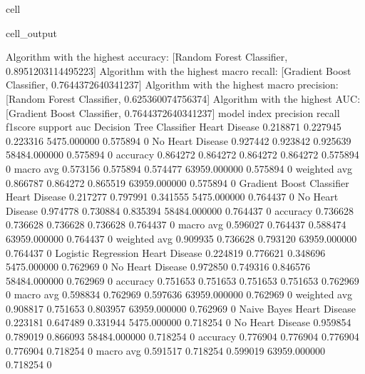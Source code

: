 \documentclass[letterpaper,10pt,english]{jupyterBook}
\begin{document}
\begin{sphinxuseclass}{cell}
\begin{sphinxVerbatimOutput}
\begin{sphinxuseclass}{cell_output}
\begin{sphinxVerbatim}[commandchars=\\\{\}]
Algorithm with the highest accuracy: [\PYGZsq{}Random Forest Classifier\PYGZsq{}, 0.8951203114495223]
Algorithm with the highest macro recall:
        [\PYGZsq{}Gradient Boost Classifier\PYGZsq{}, 0.7644372640341237]
Algorithm with the highest macro precision:
        [\PYGZsq{}Random Forest Classifier\PYGZsq{}, 0.625360074756374]
Algorithm with the highest AUC:
        [\PYGZsq{}Gradient Boost Classifier\PYGZsq{}, 0.7644372640341237]
model                      index             precision  recall    f1\PYGZhy{}score  support       auc     
Decision Tree Classifier   Heart Disease     0.218871   0.227945  0.223316  5475.000000   0.575894    0
                           No Heart Disease  0.927442   0.923842  0.925639  58484.000000  0.575894    0
                           accuracy          0.864272   0.864272  0.864272  0.864272      0.575894    0
                           macro avg         0.573156   0.575894  0.574477  63959.000000  0.575894    0
                           weighted avg      0.866787   0.864272  0.865519  63959.000000  0.575894    0
Gradient Boost Classifier  Heart Disease     0.217277   0.797991  0.341555  5475.000000   0.764437    0
                           No Heart Disease  0.974778   0.730884  0.835394  58484.000000  0.764437    0
                           accuracy          0.736628   0.736628  0.736628  0.736628      0.764437    0
                           macro avg         0.596027   0.764437  0.588474  63959.000000  0.764437    0
                           weighted avg      0.909935   0.736628  0.793120  63959.000000  0.764437    0
Logistic Regression        Heart Disease     0.224819   0.776621  0.348696  5475.000000   0.762969    0
                           No Heart Disease  0.972850   0.749316  0.846576  58484.000000  0.762969    0
                           accuracy          0.751653   0.751653  0.751653  0.751653      0.762969    0
                           macro avg         0.598834   0.762969  0.597636  63959.000000  0.762969    0
                           weighted avg      0.908817   0.751653  0.803957  63959.000000  0.762969    0
Naive Bayes                Heart Disease     0.223181   0.647489  0.331944  5475.000000   0.718254    0
                           No Heart Disease  0.959854   0.789019  0.866093  58484.000000  0.718254    0
                           accuracy          0.776904   0.776904  0.776904  0.776904      0.718254    0
                           macro avg         0.591517   0.718254  0.599019  63959.000000  0.718254    0

\end{sphinxVerbatim}
\end{sphinxuseclass}
\end{sphinxVerbatimOutput}
\end{sphinxuseclass}
\end{document}
